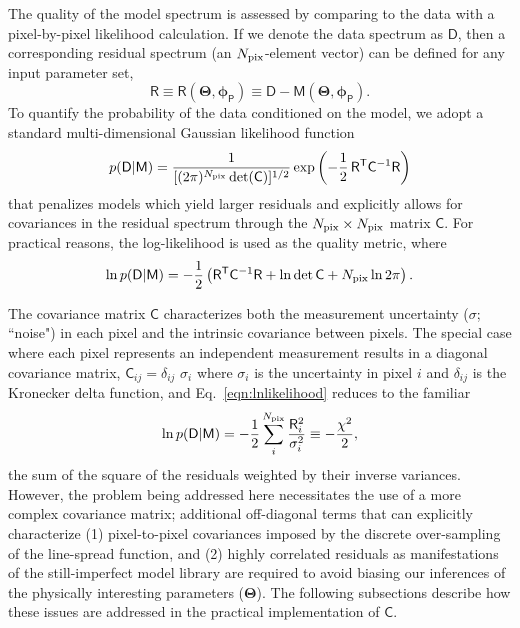 \documentclass[iop,floatfix,numberedappendix,twocolappendix]{emulateapj}
\newcommand{\vM}{\mathsf{M}}
\newcommand{\vD}{\mathsf{D}}
\newcommand{\vR}{\mathsf{R}}
\newcommand{\vC}{\mathsf{C}}
\newcommand{\trans}{\mathsf{T}}
\newcommand{\vT}{ {\bm \Theta}}
\newcommand{\vp}{ {\bm \phi}}
\newcommand{\cheb}{ \vp_{\mathsf{P}}}
\begin{document}
The quality of the model spectrum is assessed by comparing to the data with a pixel-by-pixel 
likelihood calculation.  If we denote the data spectrum as $\vD$, then a corresponding residual 
spectrum (an $N_{\rm pix}$-element vector) can be defined for any input parameter set,
\begin{equation}
\vR \equiv \vR(\vT, \cheb) \equiv \vD-\vM(\vT, \cheb).
\end{equation}
To quantify the probability of the data conditioned on the model, we adopt a standard 
multi-dimensional Gaussian likelihood function
\begin{equation}
p(\vD|\vM) =  \frac{1}{[(2 \pi)^{N_{\rm pix}} \det(\vC)]^{1/2}} \exp\left ( -\frac{1}{2} \,
   \vR^\trans \vC^{-1} \vR \right )
   \label{eqn:likelihood}
\end{equation}
that penalizes models which yield larger residuals and explicitly allows for covariances in the 
residual spectrum through the $N_{\rm pix} \times N_{\rm pix}$ matrix $\vC$.  For practical 
reasons, the log-likelihood is used as the quality metric, where
\begin{equation}
  \ln{p(\vD | \vM)} = -\frac{1}{2} \left( \vR^\trans \vC^{-1} \vR + \ln{\det{\vC}} + N_{\rm pix} \ln{2\pi} \right).
  \label{eqn:lnlikelihood}
\end{equation}

The covariance matrix $\vC$ characterizes both the measurement uncertainty ($\sigma$; ``noise") in 
each pixel and the intrinsic covariance between pixels.  The special case where each pixel 
represents an independent measurement results in a diagonal covariance matrix, $\vC_{ij} = 
\delta_{ij} \,\, \sigma_i$ where $\sigma_i$ is the uncertainty in pixel $i$ and $\delta_{ij}$ is 
the Kronecker delta function, and Eq.~\ref{eqn:lnlikelihood} reduces to the familiar
\begin{equation}
\ln{p(\vD | \vM)} = -\frac{1}{2} \sum_i^{N_{\rm pix}} \frac{\vR_i^2}{\sigma_i^2} \equiv -\frac{\chi^2}{2},
\label{eqn:chisq}
\end{equation}
the sum of the square of the residuals weighted by their inverse variances.  However, the problem 
being addressed here necessitates the use of a more complex covariance matrix; additional 
off-diagonal terms that can explicitly characterize (1) pixel-to-pixel covariances imposed by the 
discrete over-sampling of the line-spread function, and (2) highly correlated residuals as 
manifestations of the still-imperfect model library are required to avoid biasing our inferences of 
the physically interesting parameters ($\vT$).  The following subsections describe how these issues 
are addressed in the practical implementation of $\vC$.  
\end{document}
